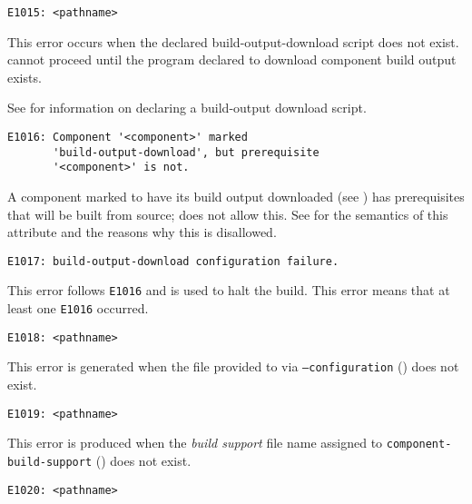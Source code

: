 \begin{verbatim}
E1015: <pathname>
\end{verbatim}

This error occurs when the declared build-output-download script does
not exist.  \lmsbw cannot proceed until the program declared to
download component build output exists.

See  for
information on declaring a build-output download script.


\begin{verbatim}
E1016: Component '<component>' marked
       'build-output-download', but prerequisite
       '<component>' is not.
\end{verbatim}

A component marked to have its build output downloaded (see
) has prerequisites that will be built
from source; \lmsbw does not allow this.  See
 for the semantics of this
attribute and the reasons why this is disallowed.


\begin{verbatim}
E1017: build-output-download configuration failure.
\end{verbatim}

This error follows \texttt{E1016} and is used to halt the build.  This
error means that at least one \texttt{E1016} occurred.


\begin{verbatim}
E1018: <pathname>
\end{verbatim}

This error is generated when the file provided to via
\texttt{--configuration} () does not
exist.


\begin{verbatim}
E1019: <pathname>
\end{verbatim}

This error is produced when the \emph{build support} file name
assigned to \texttt{component-build-support}
() does not exist.


\begin{verbatim}
E1020: <pathname>
\end{verbatim}


